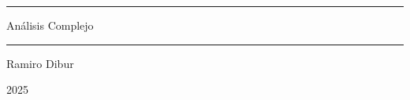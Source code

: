 \documentclass[12pt, a4paper, oneside]{book}
\theoremstyle{mdtheorem}
\theoremstyle{mddefinition}
\theoremstyle{remark}
\begin{document}
\frontmatter

\begin{titlepage}
    \begin{center}
        \vspace*{1cm}
        
        \sffamily
        \bfseries
        \textcolor{primarycolor}{\rule{\linewidth}{2pt}}
        \vspace{0.4cm}
        
        {\Huge Análisis Complejo \par}
        
        \vspace{0.4cm}
        \textcolor{primarycolor}{\rule{\linewidth}{2pt}}
        
        \vspace{2cm}
        
        {\Large Ramiro Dibur \par}
        \vspace{1cm}
        {\large 2025 \par}
    \end{center}
\end{titlepage}



\tableofcontents


\mainmatter




\end{document}
